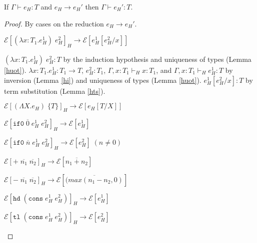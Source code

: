 \begin{hpn}
\label{hpn}
\onehalfspacing
If $\Gamma\vdash e_{H}:T$ and $e_{H}\rightarrow e_{H}'$ then $\Gamma\vdash e_{H}':T$.
\begin{proof}
By cases on the reduction $e_{H}\rightarrow e_{H}'$.
\begin{hpn-case-1}
$\mathscr{E}[(\lambda x:T_{1}.e_{H}^{1})\;e_{H}^{2}]_{H}\rightarrow\mathscr{E}[e_{H}^{1}[e_{H}^{2}/x]]$

$(\lambda x:T_{1}.e_{H}^{1})\;e_{H}^{2}:T$ by the induction hypothesis and uniqueness of types (Lemma \ref{huot}).  $\lambda x:T_{1}.e_{H}^{1}:T_{1}\rightarrow T$, $e_{H}^{2}:T_{1}$, $\Gamma,x:T_{1}\vdash_{H}x:T_{1}$, and $\Gamma,x:T_{1}\vdash_{H}e_{H}^{1}:T$ by inversion (Lemma \ref{hi}) and uniqueness of types (Lemma \ref{huot}).  $e_{H}^{1}[e_{H}^{2}/x]:T$ by term substitution (Lemma \ref{hts}).
\end{hpn-case-1}
\begin{hpn-case-2}
$\mathscr{E}[(\Lambda X.e_{H})\;\lbrace T\rbrace]_{H}\rightarrow\mathscr{E}[e_{H}[T/X]]$


\end{hpn-case-2}
\begin{hpn-case-3}
$\mathscr{E}[\mathtt{if0}\;\overline{0}\;e_{H}^{1}\;e_{H}^{2}]_{H}\rightarrow\mathscr{E}[e_{H}^{1}]$

\end{hpn-case-3}
\begin{hpn-case-4}
$\mathscr{E}[\mathtt{if0}\;\overline{n}\;e_{H}^{1}\;e_{H}^{2}]_{H}\rightarrow\mathscr{E}[e_{H}^{2}]\;(n\neq0)$

\end{hpn-case-4}
\begin{hpn-case-5}
$\mathscr{E}[+\;\overline{n_{1}}\;\overline{n_{2}}]_{H}\rightarrow\mathscr{E}[\overline{n_{1}+n_{2}}]$

\end{hpn-case-5}
\begin{hpn-case-6}
$\mathscr{E}[-\;\overline{n_{1}}\;\overline{n_{2}}]_{H}\rightarrow\mathscr{E}[\overline{(max(n_{1}-n_{2},0)}]$

\end{hpn-case-6}
\begin{hpn-case-7}
$\mathscr{E}[\mathtt{hd}\;(\mathtt{cons}\;e_{H}^{1}\;e_{H}^{2})]_{H}\rightarrow\mathscr{E}[e_{H}^{1}]$

\end{hpn-case-7}
\begin{hpn-case-8}
$\mathscr{E}[\mathtt{tl}\;(\mathtt{cons}\;e_{H}^{1}\;e_{H}^{2})]_{H}\rightarrow\mathscr{E}[e_{H}^{2}]$


\end{hpn-case-8}
\end{proof}
\end{hpn}
